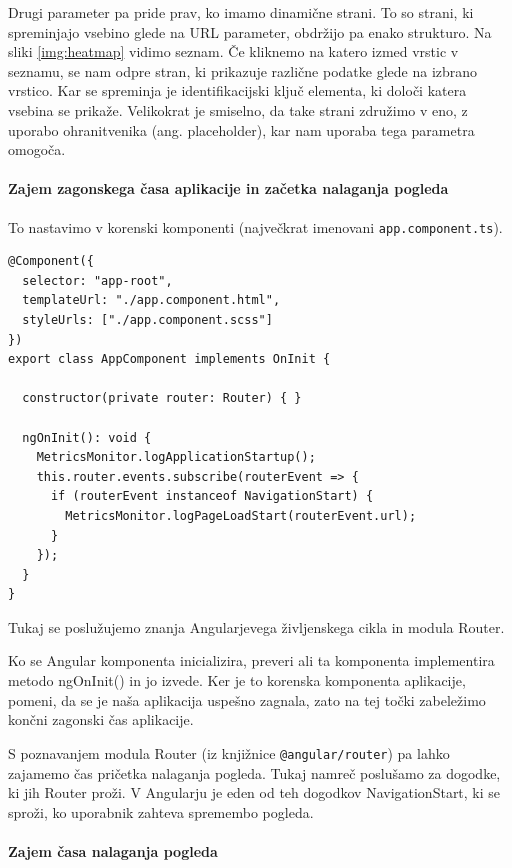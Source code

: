 \documentclass[a4paper, 12pt]{book}
\begin{document}
Drugi parameter pa pride prav, ko imamo dinamične strani. To so strani, ki spreminjajo vsebino glede na URL parameter, obdržijo pa enako strukturo. Na sliki \ref{img:heatmap} vidimo seznam. Če kliknemo na katero izmed vrstic v seznamu, se nam odpre stran, ki prikazuje različne podatke glede na izbrano vrstico. Kar se spreminja je identifikacijski ključ elementa, ki določi katera vsebina se prikaže. Velikokrat je smiselno, da take strani združimo v eno, z uporabo ohranitvenika (ang. placeholder), kar nam uporaba tega parametra omogoča.

\paragraph{Zajem zagonskega časa aplikacije in začetka nalaganja pogleda}

To nastavimo v korenski komponenti (največkrat imenovani \verb|app.component.ts|).

\begin{lstlisting}[label=lib_app_comp, caption=Zajem zagonskega časa aplikacije in začetka nalaganja pogleda]
@Component({
  selector: "app-root",
  templateUrl: "./app.component.html",
  styleUrls: ["./app.component.scss"]
})
export class AppComponent implements OnInit {

  constructor(private router: Router) { }

  ngOnInit(): void {
    MetricsMonitor.logApplicationStartup();
    this.router.events.subscribe(routerEvent => {
      if (routerEvent instanceof NavigationStart) {
        MetricsMonitor.logPageLoadStart(routerEvent.url);
      }
    });
  }
}
\end{lstlisting}

Tukaj se poslužujemo znanja Angularjevega življenskega cikla in modula Router.

Ko se Angular komponenta inicializira, preveri ali ta komponenta implementira metodo ngOnInit() in jo izvede. Ker je to korenska komponenta aplikacije, pomeni, da se je naša aplikacija uspešno zagnala, zato na tej točki zabeležimo končni zagonski čas aplikacije.

S poznavanjem modula Router (iz knjižnice \verb|@angular/router|) pa lahko zajamemo čas pričetka nalaganja pogleda. Tukaj namreč poslušamo za dogodke, ki jih Router proži. V Angularju je eden od teh dogodkov NavigationStart, ki se sproži, ko uporabnik zahteva spremembo pogleda.

\paragraph{Zajem časa nalaganja pogleda}
\end{document}
